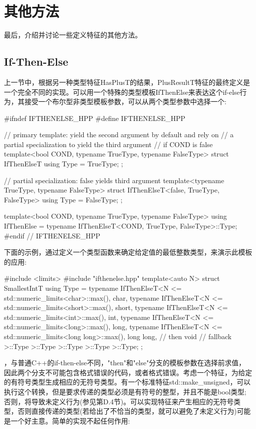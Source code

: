 \section{其他方法}

最后，介绍并讨论一些定义特征的其他方法。

\subsection{If-Then-Else}

上一节中，根据另一种类型特征HasPlusT的结果，PlusResultT特征的最终定义是一个完全不同的实现。可以用一个特殊的类型模板IfThenElse来表达这个if-else行为，其接受一个布尔型非类型模板参数，可以从两个类型参数中选择一个:

\begin{cpp}
#ifndef IFTHENELSE_HPP
#define IFTHENELSE_HPP

// primary template: yield the second argument by default and rely on
// a partial specialization to yield the third argument
// if COND is false
template<bool COND, typename TrueType, typename FalseType>
struct IfThenElseT {
	using Type = TrueType;
};

// partial specialization: false yields third argument
template<typename TrueType, typename FalseType>
struct IfThenElseT<false, TrueType, FalseType> {
	using Type = FalseType;
};

template<bool COND, typename TrueType, typename FalseType>
using IfThenElse = typename IfThenElseT<COND, TrueType, FalseType>::Type;
#endif // IFTHENELSE_HPP
\end{cpp}

下面的示例，通过定义一个类型函数来确定给定值的最低整数类型，来演示此模板的应用:

\begin{cpp}
#include <limits>
#include "ifthenelse.hpp"
template<auto N>
struct SmallestIntT {
	using Type =
	typename IfThenElseT<N <= std::numeric_limits<char>::max(), char,
	typename IfThenElseT<N <= std::numeric_limits<short>::max(), short,
	typename IfThenElseT<N <= std::numeric_limits<int>::max(), int,
	typename IfThenElseT<N <= std::numeric_limits<long>::max(), long,
	typename IfThenElseT<N <= std::numeric_limits<long long>::max(),
	long long, // then
	void // fallback
	>::Type
	>::Type
	>::Type
	>::Type
	>::Type;
};
\end{cpp}

，与普通C++的if-then-else不同，"then"和"else"分支的模板参数在选择前求值，因此两个分支不可能包含格式错误的代码，或者格式错误。考虑一个特征，为给定的有符号类型生成相应的无符号类型。有一个标准特征std::make\_unsigned，可以执行这个转换，但是要求传递的类型必须是有符号的整型，并且不能是bool类型;否则，将导致未定义行为(参见第D.4节)。可以实现特征来产生相应的无符号类型，否则直接传递的类型(若给出了不恰当的类型，就可以避免了未定义行为)可能是一个好主意。简单的实现不起任何作用:

